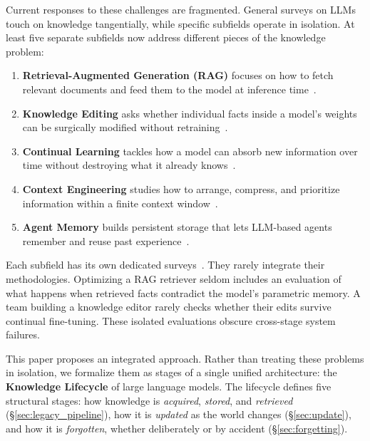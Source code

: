 \documentclass[manuscript, screen, review]{jair}
\begin{document}
Current responses to these challenges are fragmented. General surveys on LLMs~\citep{zhao2023surveyllm, wang2024agents} touch on knowledge tangentially, while specific subfields operate in isolation. At least five separate subfields now address different pieces of the knowledge problem:

\begin{enumerate}[leftmargin=*]
  \item \textbf{Retrieval-Augmented Generation (RAG)} focuses on how to fetch relevant documents and feed them to the model at inference time~\citep{lewis2020rag, guu2020realm, gao2023ragsurvey}.
  \item \textbf{Knowledge Editing} asks whether individual facts inside a model's weights can be surgically modified without retraining~\citep{meng2022rome, meng2023memit, yao2023editingsurvey}.
  \item \textbf{Continual Learning} tackles how a model can absorb new information over time without destroying what it already knows~\citep{kirkpatrick2017ewc, ke2023continual, wu2024continual}.
  \item \textbf{Context Engineering} studies how to arrange, compress, and prioritize information within a finite context window~\citep{liu2024lost}.
  \item \textbf{Agent Memory} builds persistent storage that lets LLM-based agents remember and reuse past experience~\citep{park2023generative, packer2023memgpt, hu2025agentmemory}.
\end{enumerate}

Each subfield has its own dedicated surveys~\citep{gao2023ragsurvey, mialon2023augmented, hu2025agentmemory, wu2025humanmemory}. They rarely integrate their methodologies. Optimizing a RAG retriever seldom includes an evaluation of what happens when retrieved facts contradict the model's parametric memory. A team building a knowledge editor rarely checks whether their edits survive continual fine-tuning. These isolated evaluations obscure cross-stage system failures.

This paper proposes an integrated approach. Rather than treating these problems in isolation, we formalize them as stages of a single unified architecture: the \textbf{Knowledge Lifecycle} of large language models. The lifecycle defines five structural stages: how knowledge is \textit{acquired}, \textit{stored}, and \textit{retrieved} (\S\ref{sec:legacy_pipeline}), how it is \textit{updated} as the world changes (\S\ref{sec:update}), and how it is \textit{forgotten}, whether deliberately or by accident (\S\ref{sec:forgetting}).
\end{document}
